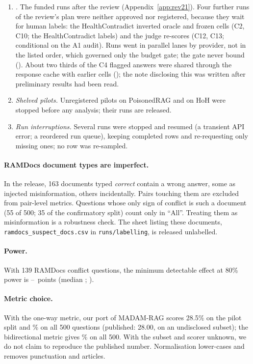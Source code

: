 \begin{enumerate}[leftmargin=*,itemsep=1pt,topsep=2pt]
\item \emph{.} The funded runs after the review (Appendix~\ref{app:rev21}). Four further runs of the review's
plan were neither approved nor registered, because they wait for human labels: the HealthContradict inverted oracle
and frozen cells (C2, C10; the HealthContradict labels) and the judge re-scores (C12, C13; conditional on the A1
audit). Runs went in parallel lanes by provider, not in the listed order, which governed only the
budget gate; the gate never bound (). About two thirds of the C4 flagged answers were shared through the
response cache with earlier cells (); the note disclosing this was written after preliminary results had
been read.
\item \emph{Shelved pilots.} Unregistered pilots on PoisonedRAG \citep{zou2025poisonedrag} and on HoH were stopped
before any analysis; their runs are released.
\item \emph{Run interruptions.} Several runs were stopped and resumed (a transient API error; a reordered run
queue), keeping completed rows and re-requesting only missing ones; no row was re-sampled.
\end{enumerate}

\paragraph{RAMDocs document types are imperfect.} In the release, 163 documents typed \emph{correct} contain a
wrong answer, some as injected misinformation, others incidentally. Pairs touching them are excluded from pair-level
metrics. Questions whose only sign of conflict is such a document (55 of 500; 35 of the confirmatory split) count
only in ``All''. Treating them as misinformation is a robustness check. The sheet listing these
documents, \texttt{ramdocs\_suspect\_docs.csv} in \texttt{runs/labelling}, is released unlabelled.

\paragraph{Power.} With 139 RAMDocs conflict questions, the minimum detectable effect at 80\% power is
\mdeLo--\mdeHi\ points (median \mdeMed; \citealp{card2020power}).

\paragraph{Metric choice.} With the one-way metric, our port of MADAM-RAG scores 28.5\% on the pilot split and
\madamOneWay\% on all 500 questions (published: 28.00, on an undisclosed subset); the bidirectional metric gives
\madamBidir\% on all 500. With the subset and scorer unknown, we do not claim to reproduce the
published number. Normalisation lower-cases and removes punctuation and articles.

